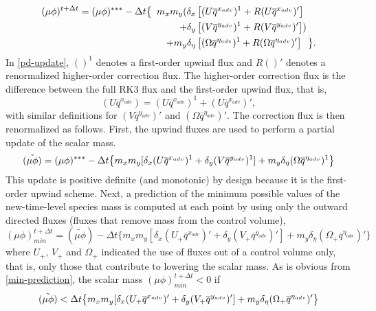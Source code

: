 \begin{align}
(\mu\phi)^{t+\Delta t} = (\mu\phi)^{***} - {\Delta t}\bigl\{ \,\,\,
m_x m_y ( \delta_x &\left[ (U \overline{q}^{x_{adv}})^1 
+ R(U \overline{q}^{x_{adv}})' \right] 
\notag
\\
+\delta_y &\left[(V\overline{q}^{y_{adv}})^1 
+ R(V\overline{q}^{y_{adv}})'\right] )
\notag
\\
+ m_y \delta_\eta &\left[
(\Omega \overline{q}^{\eta_{adv}})^1 + R(\Omega \overline{q}^{\eta_{adv}})' \right]
\,\,\,\, \bigr\}.
\label{pd-update}
\end{align}
%
In \eqref{pd-update}, $()^1$ denotes a first-order upwind flux and $R()'$
denotes a renormalized higher-order correction flux.  The higher-order
correction flux is the difference between the full RK3 flux and the
first-order upwind flux, that is,
%
\begin{equation}
(U \overline{q}^{x_{adv}}) = (U \overline{q}^{x_{adv}})^1 + (U
\overline{q}^{x_{adv}})',
\label{correction-def}
\end{equation}
%
with similar definitions for $(V \overline{q}^{y_{adv}})'$ 
and $(\Omega \overline{q}^{\eta_{adv}})'$.  The correction flux is then
renormalized as follows.  First, the upwind fluxes are used to perform a
partial update of the scalar mass.
%
\begin{equation}
(\tilde{\mu\phi}) = (\mu\phi)^{***} 
- {\Delta t} \bigl\{
m_x m_y [\delta_x (U \overline{q}^{x_{adv}})^1 
+ \delta_y (V\overline{q}^{y_{adv}})^1] 
+ m_y \delta_\eta
(\Omega \overline{q}^{\eta_{adv}})^1\bigr\}
\notag
\end{equation}
%
This update is positive definite (and monotonic) by design because it is
the first-order upwind scheme.  Next, a prediction of the minimum
possible values of the new-time-level species mass is computed at each
point by using only the outward directed fluxes (fluxes that remove mass
from the control volume),
%
\begin{equation}
(\mu\phi)_{min}^{t+\Delta t} = (\tilde{\mu\phi}) 
-{\Delta t} \bigl\{
m_x m_y [\delta_x (U_+ \overline{q}^{x_{adv}})' 
+ \delta_y (V_+\overline{q}^{y_{adv}})'] 
+ m_y \delta_\eta
(\Omega_+ \overline{q}^{\eta_{adv}})'\bigr\}
\label{min-prediction}
\end{equation}
%
where $U_+$, $V_+$ and $\Omega_+$ indicated the use of fluxes 
out of a control volume only, that is, only those that contribute to
lowering the scalar mass.  As is obvious from \eqref{min-prediction},
the scalar mass $(\mu\phi)_{min}^{t+\Delta t} < 0$ if 
%
\begin{equation}
(\tilde{\mu\phi}) < 
{\Delta t} \bigl\{
m_x m_y [\delta_x (U_+ \overline{q}^{x_{adv}})' 
+ \delta_y (V_+\overline{q}^{y_{adv}})'] 
+ m_y \delta_\eta
(\Omega_+ \overline{q}^{\eta_{adv}})'\bigr\}
\notag
\end{equation}
